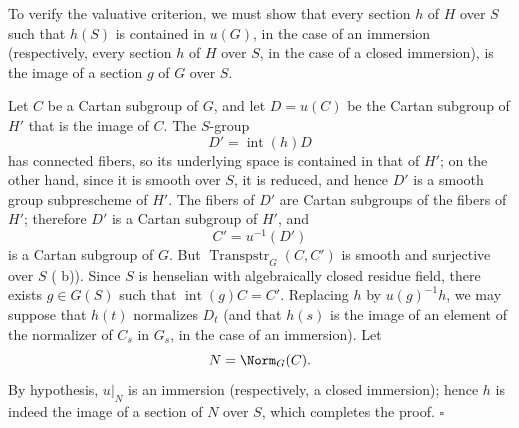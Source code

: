 To verify the valuative criterion, we must show that every section
\(h\) of \(H\) over \(S\) such that \(h(S)\) is contained in
\(u(G)\), in the case of an immersion (respectively, every section
\(h\) of \(H\) over \(S\), in the case of a closed immersion), is
the image of a section \(g\) of \(G\) over \(S\).

Let \(C\) be a Cartan subgroup of \(G\), and let
\(D=u(C)\) be the Cartan subgroup of \(H'\) that is the image of
\(C\). The \(S\)-group
\[
  D'=\operatorname{int}(h)D
\]
has connected fibers, so its underlying space is contained in that
of \(H'\); on the other hand, since it is smooth over \(S\), it is
reduced, and hence \(D'\) is a smooth group subprescheme of \(H'\).
The fibers of \(D'\) are Cartan subgroups of the fibers of \(H'\);
therefore \(D'\) is a Cartan subgroup of \(H'\), and
\[
  C'=u^{-1}(D')
\]
is a Cartan subgroup of \(G\). But
\(\operatorname{Transpstr}_G(C,C')\) is smooth and surjective over
\(S\) ( b)). Since \(S\) is henselian with
algebraically closed residue field, there exists \(g\in G(S)\) such
that \(\operatorname{int}(g)C=C'\). Replacing \(h\) by
\(u(g)^{-1}h\), we may suppose that \(h(t)\) normalizes \(D_t\)
(and that \(h(s)\) is the image of an element of the normalizer of
\(C_s\) in \(G_s\), in the case of an immersion). Let
\[
  N=\Norm_G(C).
\]
By hypothesis, \(u|_N\) is an immersion (respectively, a closed
immersion); hence \(h\) is indeed the image of a section of \(N\)
over \(S\), which completes the proof.
\hfill\(\square\)

